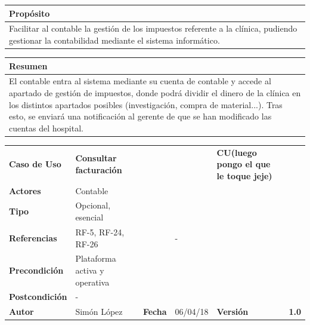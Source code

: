 \documentclass[11pt,a4paper]{article}
\begin{document}
\begin{table}[h]
	\centering
	\begin{tabular}{l}
		\hline
		\multicolumn{1}{|l|}{Propósito} \\ \hline
		Facilitar al contable la gestión de los impuestos referente a la clínica, pudiendo gestionar la contabilidad mediante el sistema informático.
	\end{tabular}
\end{table}

\begin{table}[h]
	\centering
	\begin{tabular}{l}
		\hline
		\multicolumn{1}{|l|}{Resumen} \\ \hline
		El contable entra al sistema mediante su cuenta de contable y accede al apartado de gestión de impuestos, donde podrá dividir el dinero de la clínica en los distintos apartados posibles (investigación, compra de material...). Tras esto, se enviará una notificación al gerente de que se han modificado las cuentas del hospital. 
	\end{tabular}
\end{table}


\begin{table}[h]
	\centering
	\begin{tabular}{|l|lllll}
		\cline{1-1} \cline{6-6}
		\textbf{Caso de Uso}   & \textbf{Consultar facturación} &   &  & \multicolumn{1}{l|}{\textbf{\textbf{CU(luego pongo el que le toque jeje)}}}        & \multicolumn{1}{l|}{\textbf{}} \\ \cline{1-1} \cline{6-6} 
		\textbf{Actores}       & Contable &                                     &                       &                                       & \textbf{}                      \\ \cline{1-1}
		\textbf{Tipo}          & Opcional, esencial  &                                     &                       &                                       & \textbf{}                      \\ \cline{1-1}
		\textbf{Referencias}   & RF-5, RF-24, RF-26                         &     & -                     &                                       & \textbf{}                      \\ \cline{1-1}
		\textbf{Precondición}  & Plataforma activa y operativa                    &                      &                                       & \textbf{}                      \\ \cline{1-1}
		\textbf{Postcondición} & -                                                                                        &                      &                &                &               \\ \cline{1-1} \cline{3-3} \cline{5-5}
		\textbf{Autor}         & \multicolumn{1}{l|}{Simón López} & \multicolumn{1}{l|}{\textbf{Fecha}} & \multicolumn{1}{l|}{06/04/18} & \multicolumn{1}{l|}{\textbf{Versión}} & \textbf{1.0}                      \\ \cline{1-1} \cline{3-3} \cline{5-5}
	\end{tabular}
\end{table}
\end{document}
